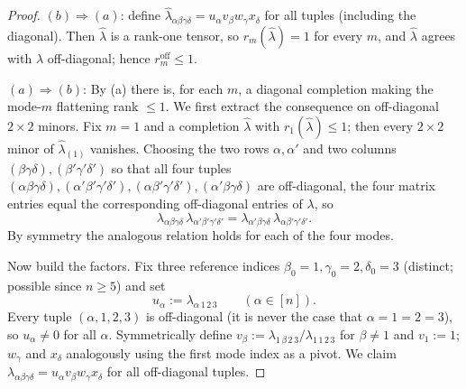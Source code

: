 \begin{proof}
$(b)\Rightarrow(a)$: define $\widehat\lambda_{\alpha\beta\gamma\delta}
=u_\alpha v_\beta w_\gamma x_\delta$ for all tuples (including the diagonal). Then
$\widehat\lambda$ is a rank-one tensor, so $r_m(\widehat\lambda)=1$ for every $m$, and
$\widehat\lambda$ agrees with $\lambda$ off-diagonal; hence $r_m^{\mathrm{off}}\le1$.

$(a)\Rightarrow(b)$: By (a) there is, for each $m$, a diagonal completion making the
mode-$m$ flattening rank $\le1$. We first extract the consequence on off-diagonal
$2\times2$ minors. Fix $m=1$ and a completion $\widehat\lambda$ with $r_1(\widehat\lambda)
\le1$; then every $2\times2$ minor of $\widehat\lambda_{(1)}$ vanishes. Choosing the two
rows $\alpha,\alpha'$ and two columns $(\beta\gamma\delta),(\beta'\gamma'\delta')$ so
that all four tuples $(\alpha\beta\gamma\delta),(\alpha'\beta'\gamma'\delta'),
(\alpha\beta'\gamma'\delta'),(\alpha'\beta\gamma\delta)$ are off-diagonal, the four
matrix entries equal the corresponding off-diagonal entries of $\lambda$, so
\begin{equation}\label{eq:2x2}
\lambda_{\alpha\beta\gamma\delta}\,\lambda_{\alpha'\beta'\gamma'\delta'}
=\lambda_{\alpha'\beta\gamma\delta}\,\lambda_{\alpha\beta'\gamma'\delta'}.
\end{equation}
By symmetry the analogous relation holds for each of the four modes.

Now build the factors. Fix three reference indices $\beta_0=1,\gamma_0=2,\delta_0=3$
(distinct; possible since $n\ge5$) and set
\begin{equation}\label{eq:udef}
u_\alpha:=\lambda_{\alpha\,1\,2\,3}\qquad(\alpha\in[n]).
\end{equation}
Every tuple $(\alpha,1,2,3)$ is off-diagonal (it is never the case that
$\alpha=1=2=3$), so $u_\alpha\neq0$ for all $\alpha$. Symmetrically define
$v_\beta:=\lambda_{1\,\beta\,2\,3}/\lambda_{1\,1\,2\,3}$ for $\beta\neq1$ and $v_1:=1$;
$w_\gamma$ and $x_\delta$ analogously using the first mode index as a pivot. We claim
$\lambda_{\alpha\beta\gamma\delta}=u_\alpha v_\beta w_\gamma x_\delta$ for all
off-diagonal tuples.


\end{proof}
